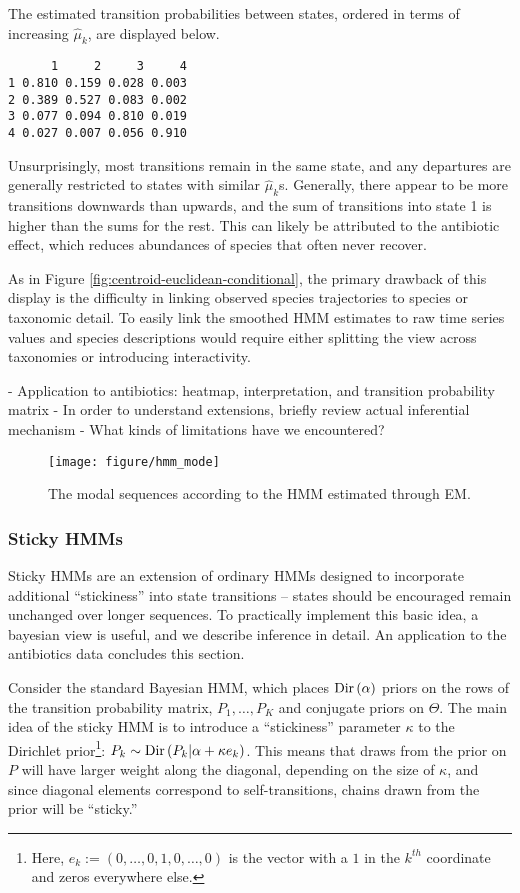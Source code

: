 \documentclass{article}
\begin{document}
The estimated transition probabilities between states, ordered in terms of
increasing $\hat{\mu}_{k}$, are displayed below.
\begin{verbatim}
      1     2     3     4
1 0.810 0.159 0.028 0.003
2 0.389 0.527 0.083 0.002
3 0.077 0.094 0.810 0.019
4 0.027 0.007 0.056 0.910
\end{verbatim}
Unsurprisingly, most transitions remain in the same state, and any departures
are generally restricted to states with similar $\hat{\mu}_{k}$s. Generally,
there appear to be more transitions downwards than upwards, and the sum of
transitions into state 1 is higher than the sums for the rest. This can likely
be attributed to the antibiotic effect, which reduces abundances of species that
often never recover.

As in Figure \ref{fig:centroid-euclidean-conditional}, the primary drawback of
this display is the difficulty in linking observed species trajectories to
species or taxonomic detail. To easily link the smoothed HMM estimates to raw
time series values and species descriptions would require either splitting the
view across taxonomies or introducing interactivity.

- Application to antibiotics: heatmap, interpretation, and transition
probability matrix
- In order to understand extensions, briefly review actual inferential mechanism
- What kinds of limitations have we encountered?

\begin{figure}[ht]
  \centering
  \texttt{[image: figure/hmm\_mode]}
  \caption{The modal sequences according to the HMM estimated through
    EM. \label{fig:hmm_mode} }
\end{figure}

\subsubsection{Sticky HMMs}
\label{sec:sticky_hmms}

Sticky HMMs are an extension of ordinary HMMs designed to incorporate
additional ``stickiness'' into state transitions -- states should be encouraged
remain unchanged over longer sequences. To practically implement this basic
idea, a bayesian view is useful, and we describe inference in detail. An
application to the antibiotics data concludes this section.

Consider the standard Bayesian HMM, which places $\textnormal{Dir}\left(\alpha\right)$
priors on the rows of the transition probability matrix, $P_{1}, \dots, P_{K}$
and conjugate priors on $\Theta$. The main idea of the sticky HMM is to
introduce a ``stickiness'' parameter $\kappa$ to the Dirichlet
prior\footnote{Here, $e_{k} := \left(0, \dots, 0, 1, 0, \dots, 0\right)$ is the
  vector with a $1$ in the $k^{th}$ coordinate and zeros everywhere else.}:
$P_{k} \sim \textnormal{Dir}\left(P_{k} \vert \alpha + \kappa e_{k}\right)$. This means that
draws from the prior on $P$ will have larger weight along the diagonal,
depending on the size of $\kappa$, and since diagonal elements correspond to
self-transitions, chains drawn from the prior will be ``sticky.''
\end{document}
